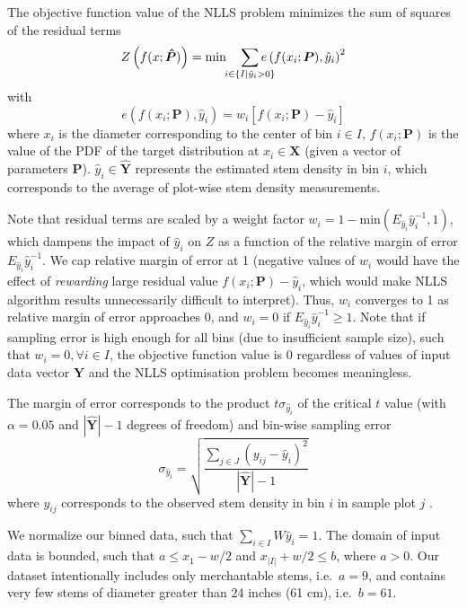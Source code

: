 \documentclass{article}
\begin{document}
The objective function value of the NLLS problem minimizes the sum of squares of the residual terms
\begin{equation}
Z\left(f(x; \bm{\hat{P}})\right) = \text{min} \quad \sum_{\mathclap{i \in \{I|\hat{y}_i > 0\}}} e\left(f(x_i; \bm{P}), \hat{y}_i\right)^2 \label{eq:z}
\end{equation}
with
\begin{equation}
e\left(f(x_i; \bm{P}), \hat{y}_i\right) = w_i \left[f(x_i; \bm{P}) - \hat{y}_i\right] 
\end{equation}
where $x_i$ is the diameter corresponding to the center of bin $i \in I$, $f(x_i; \bm{P})$ is the value of the PDF of the target distribution at $x_i \in \bm{X}$ (given a vector of parameters $\bm{P}$). $\hat{y}_i \in \bm{\hat{Y}}$ represents the estimated stem density in bin $i$, which corresponds to the average of plot-wise stem density measurements.

Note that residual terms are scaled by a weight factor $w_i = 1 - \text{min}(E_{\hat{y}_i}\hat{y}_i^{-1}, 1)$, which dampens the impact of $\hat{y}_i$ on $Z$ as a function of the relative margin of error $E_{\hat{y}_i}\hat{y}_i^{-1}$. We cap relative margin of error at 1 (negative values of $w_i$ would have the effect of \emph{rewarding} large residual value $f(x_i; \bm{P}) - \hat{y}_i$, which would make NLLS algorithm results unnecessarily difficult to interpret).  
Thus, $w_i$ converges to 1 as relative margin of error approaches 0, and $w_i = 0$ if $E_{\hat{y}_i}\hat{y}_i^{-1} \geq 1$. 
Note that if sampling error is high enough for all bins (due to insufficient sample size), such that  $w_i = 0, \forall i \in I$, the objective function value is 0 regardless of values of input data vector $\bm{\hat{Y}}$ and the NLLS optimisation problem becomes meaningless.

The margin of error corresponds to the product $t\sigma_{\hat{y}_i}$ of the critical $t$ value (with $\alpha=0.05$ and $|\bm{\hat{Y}}|  - 1$ degrees of freedom) and bin-wise sampling error
\begin{equation}
\sigma_{\hat{y}_i}  = \sqrt{\frac{\sum_{j \in J} \left(y_{ij} - \hat{y}_i\right)^2}{|\bm{\hat{Y}}| - 1}}
\end{equation}
where $y_{ij}$ corresponds to the observed stem density in bin $i$ in sample plot $j$ \citep{schreuder2004statistical}.


We normalize our binned data, such that $\sum_{i \in I} W\hat{y}_i = 1$.
The domain of input data is bounded, such that $a \leq x_1 - w/2$ and $x_{|I|} + w/2 \leq b$, where $a > 0$.
Our dataset intentionally includes only merchantable stems, i.e.~$a=9$, and contains very few stems of diameter greater than 24 inches (61 cm), i.e.~$b = 61$.
\end{document}
